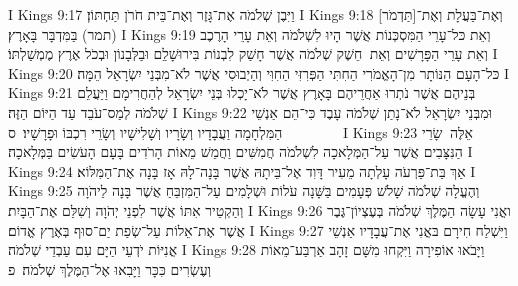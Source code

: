 I Kings 9:17	וַיִּבֶן שְׁלֹמֹה אֶת־גָּזֶר וְאֶת־בֵּית חֹרֹן תַּחְתּוֹן׃
I Kings 9:18	וְאֶת־בַּעֲלָת וְאֶת־[תַּדְמֹר] (תמר) בַּמִּדְבָּר בָּאָרֶץ׃
I Kings 9:19	וְאֵת כּל־עָרֵי הַמִּסְכְּנוֹת אֲשֶׁר הָיוּ לִשְׁלֹמֹה וְאֵת עָרֵי הָרֶכֶב וְאֵת עָרֵי הַפָּרָשִׁים וְאֵת  חֵשֶׁק שְׁלֹמֹה אֲשֶׁר חָשַׁק לִבְנוֹת בִּירוּשָׁלַ͏ִם וּבַלְּבָנוֹן וּבְכֹל אֶרֶץ מֶמְשַׁלְתּוֹ׃
I Kings 9:20	כּל־הָעָם הַנּוֹתָר מִן־הָאֱמֹרִי הַחִתִּי הַפְּרִזִּי הַחִוִּי וְהַיְבוּסִי אֲשֶׁר לֹא־מִבְּנֵי יִשְׂרָאֵל הֵמָּה׃
I Kings 9:21	בְּנֵיהֶם אֲשֶׁר נֹתְרוּ אַחֲרֵיהֶם בָּאָרֶץ אֲשֶׁר לֹא־יָכְלוּ בְּנֵי יִשְׂרָאֵל לְהַחֲרִימָם וַיַּעֲלֵם שְׁלֹמֹה לְמַס־עֹבֵד עַד הַיּוֹם הַזֶּה׃
I Kings 9:22	וּמִבְּנֵי יִשְׂרָאֵל לֹא־נָתַן שְׁלֹמֹה עָבֶד כִּי־הֵם אַנְשֵׁי הַמִּלְחָמָה וַעֲבָדָיו וְשָׂרָיו וְשָׁלִישָׁיו וְשָׂרֵי רִכְבּוֹ וּפָרָשָׁיו׃ {ס}        
I Kings 9:23	אֵלֶּה  שָׂרֵי הַנִּצָּבִים אֲשֶׁר עַל־הַמְּלָאכָה לִשְׁלֹמֹה חֲמִשִּׁים וַחֲמֵשׁ מֵאוֹת הָרֹדִים בָּעָם הָעֹשִׂים בַּמְּלָאכָה׃
I Kings 9:24	אַךְ בַּת־פַּרְעֹה עָלְתָה מֵעִיר דָּוִד אֶל־בֵּיתָהּ אֲשֶׁר בָּנָה־לָהּ אָז בָּנָה אֶת־הַמִּלּוֹא׃
I Kings 9:25	וְהֶעֱלָה שְׁלֹמֹה שָׁלֹשׁ פְּעָמִים בַּשָּׁנָה עֹלוֹת וּשְׁלָמִים עַל־הַמִּזְבֵּחַ אֲשֶׁר בָּנָה לַיהֹוָה וְהַקְטֵיר אִתּוֹ אֲשֶׁר לִפְנֵי יְהֹוָה וְשִׁלַּם אֶת־הַבָּיִת׃
I Kings 9:26	ואֳנִי עָשָׂה הַמֶּלֶךְ שְׁלֹמֹה בְּעֶצְיוֹן־גֶּבֶר אֲשֶׁר אֶת־אֵלוֹת עַל־שְׂפַת יַם־סוּף בְּאֶרֶץ אֱדוֹם׃
I Kings 9:27	וַיִּשְׁלַח חִירָם בּאֳנִי אֶת־עֲבָדָיו אַנְשֵׁי אֳנִיּוֹת יֹדְעֵי הַיָּם עִם עַבְדֵי שְׁלֹמֹה׃
I Kings 9:28	וַיָּבֹאוּ אוֹפִירָה וַיִּקְחוּ מִשָּׁם זָהָב אַרְבַּע־מֵאוֹת וְעֶשְׂרִים כִּכָּר וַיָּבִאוּ אֶל־הַמֶּלֶךְ שְׁלֹמֹה׃ {פ}
